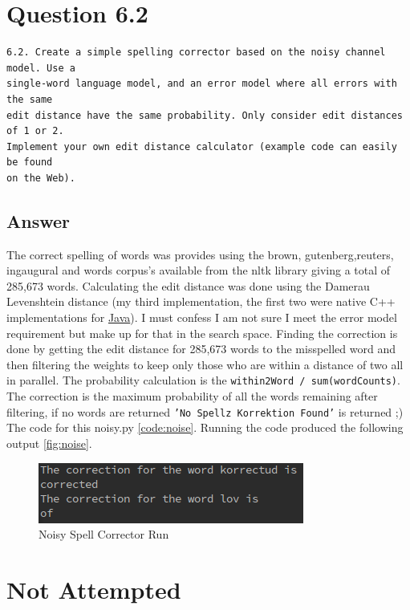 \documentclass[11pt]{article}
\newenvironment{code}{\captionsetup{type=listing}}{}
\begin{document}
\begin{code}
\label{code:associations}
\end{code}
\newpage
\section{Question 6.2}
\begin{verbatim}
6.2. Create a simple spelling corrector based on the noisy channel model. Use a
single-word language model, and an error model where all errors with the same
edit distance have the same probability. Only consider edit distances of 1 or 2.
Implement your own edit distance calculator (example code can easily be found
on the Web).
\end{verbatim}
\subsection{Answer}
The correct spelling of words was provides using the brown, gutenberg,reuters, ingaugural and words corpus's available from the nltk library giving a total of 285,673 words. Calculating the edit distance was done using the Damerau Levenshtein distance (my third implementation, the first two were native C++ implementations for \href{https://github.com/N0taN3rd/Native-To-Java-StringUtils}{Java}). I must confess I am not sure I meet the error model requirement but make up for that in the search space. Finding the correction is done by getting the edit distance for 285,673 words to the misspelled word and then filtering the weights to keep only those who are within a distance of two all in parallel. The probability calculation is the \texttt{within2Word / sum(wordCounts)}. The correction is the maximum probability of all the words remaining after filtering, if no words are returned \texttt{'No Spellz Korrektion Found'} is returned ;) \newline The code for this noisy.py \autoref{code:noise}.
Running the code  produced the following output \autoref{fig:noise}.
\begin{figure}[H]
\centering
\includegraphics[scale=0.8]{noisy.png}
\caption{Noisy Spell Corrector Run}
\label{fig:noise}
\end{figure}
\begin{code}
\label{code:noise}
\end{code}
\section{Not Attempted}
\begin{code}
 \label{code:rg}
\end{code}
\end{document}
